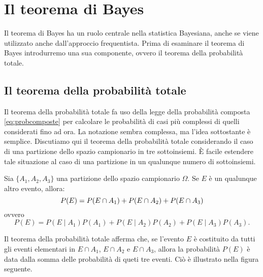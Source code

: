 \chapter{Il teorema di Bayes}
\label{chapter:bayes_theo} 


Il teorema di Bayes ha un ruolo centrale nella statistica Bayesiana, anche se viene utilizzato anche dall'approccio frequentista.
Prima di esaminare il teorema di Bayes introdurremo una sua componente, ovvero il teorema della probabilità totale.

\section{Il teorema della probabilità totale}
\label{sec:tot_prob_theorem}

Il teorema della probabilità totale fa uso della legge della probabilità composta \eqref{eq:probcomposte} per calcolare le probabilità di casi più complessi di quelli considerati fino ad ora. 
La notazione sembra complessa, ma l'idea sottostante è semplice. 
Discutiamo qui il teorema della probabilità totale considerando il caso di una partizione dello spazio campionario in tre sottoinsiemi. 
È facile estendere tale situazione al caso di una partizione in un qualunque numero di sottoinsiemi.
\begin{teorema}
Sia $\{A_1, A_2, A_3\}$ una partizione dello spazio campionario $\Omega$. Se $E$ è un qualunque altro evento, allora:
\begin{equation}
P(E) = P(E \cap A_1) + P(E \cap A_2) + P(E \cap A_3) \notag
\label{eq:prob_total_1a}
\end{equation}
\noindent ovvero
\begin{equation}
P(E) = P(E \mid A_1) P(A_1) + P (E \mid A_2) P(A_2) + P(E \mid A_3) P(A_3).
\label{eq:prob_total_1b}
\end{equation}
\end{teorema}

Il teorema della probabilità totale afferma che, se l'evento $E$ è costituito da tutti gli eventi elementari in $E \cap A_1$, $E \cap A_2$ e $E \cap A_3$, allora la probabilità $P(E)$ è data dalla somma delle probabilità di queti tre eventi. 
Ciò è illustrato nella figura seguente.

